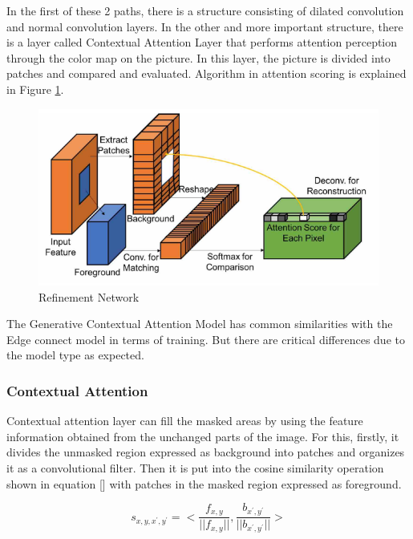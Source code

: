 In the first of these 2 paths, there is a structure consisting of dilated convolution and normal convolution layers. In the other and more important structure, there is a layer called Contextual Attention Layer that performs attention perception through the color map on the picture. In this layer, the picture is divided into patches and compared and evaluated. Algorithm in attention scoring is explained in Figure \ref{fig:attention-scoring}.

\begin{figure}[h]
    \centering
    \includegraphics[scale=0.85]{figures/chapter4/GenerativeScoring.PNG}
    \caption{Refinement Network}
    \label{fig:attention-scoring}
\end{figure}

The Generative Contextual Attention Model has common similarities with the Edge connect model in terms of training. But there are critical differences due to the model type as expected. 

\subsubsection{Contextual Attention}

Contextual attention layer can fill the masked areas by using the feature information obtained from the unchanged parts of the image. For this, firstly, it divides the unmasked region expressed as background into patches and organizes it as a convolutional filter. Then it is put into the cosine similarity operation shown in equation [] with patches in the masked region expressed as foreground.

\begin{equation}
\label{eqn:context}
    s_{x,y,x^{'},y^{'}} = <\frac{f_{x,y}}{||f_{x,y}||}, \frac{b_{x^',y^'}}{||b_{x^{'},y^{'}}||}>
\end{equation}

